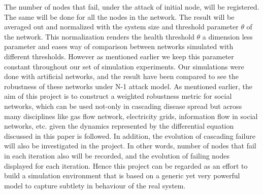 \documentclass[11pt]{article}
\begin{document}
The number of nodes that fail, under the attack of initial node, will be registered. The same will be done for all the nodes in the network. The result will be averaged out and normalized with the system size and threshold parameter $\theta$ of the network. This normalization renders the health threshold $\theta$ a dimension less parameter and eases way of comparison between networks simulated with different thresholds. However as mentioned earlier we keep this parameter constant throughout our set of simulation experiments. Our simulations were done with artificial networks, and the result have been compared to see the robustness of these networks under N-1 attack model. As mentioned earlier, the aim of this project is to construct a weighted robustness metric for social networks, which can be used not-only in cascading disease spread but across many disciplines like gas flow network, electricity grids, information flow in social networks, etc. given the dynamics represented by the differential equation discussed in this paper is followed. In addition, the evolution of cascading failure will also be investigated in the project. In other words, number of nodes that fail in each iteration also will be recorded, and the evolution of failing nodes displayed for each iteration. Hence this project can be regarded as an effort to build a simulation environment that is based on a generic yet very powerful model to capture subtlety in behaviour of the real system.
\end{document}
